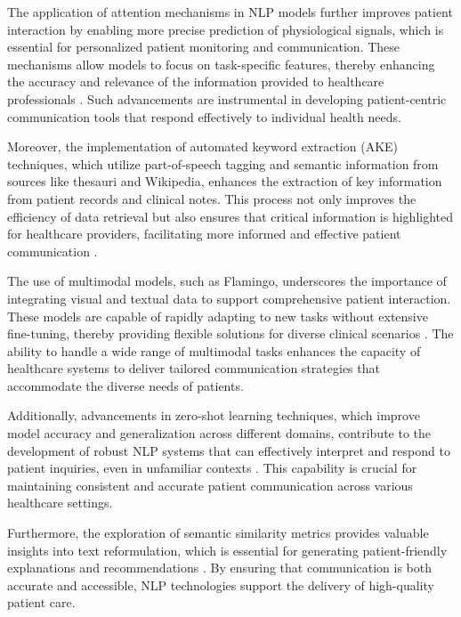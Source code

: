The application of attention mechanisms in NLP models further improves patient interaction by enabling more precise prediction of physiological signals, which is essential for personalized patient monitoring and communication. These mechanisms allow models to focus on task-specific features, thereby enhancing the accuracy and relevance of the information provided to healthcare professionals \cite{park2022attentionmechanismsphysiologicalsignal}. Such advancements are instrumental in developing patient-centric communication tools that respond effectively to individual health needs.



Moreover, the implementation of automated keyword extraction (AKE) techniques, which utilize part-of-speech tagging and semantic information from sources like thesauri and Wikipedia, enhances the extraction of key information from patient records and clinical notes. This process not only improves the efficiency of data retrieval but also ensures that critical information is highlighted for healthcare providers, facilitating more informed and effective patient communication \cite{altuncu2022improvingperformanceautomatickeyword}.



The use of multimodal models, such as Flamingo, underscores the importance of integrating visual and textual data to support comprehensive patient interaction. These models are capable of rapidly adapting to new tasks without extensive fine-tuning, thereby providing flexible solutions for diverse clinical scenarios \cite{alayrac2022flamingo}. The ability to handle a wide range of multimodal tasks enhances the capacity of healthcare systems to deliver tailored communication strategies that accommodate the diverse needs of patients.



Additionally, advancements in zero-shot learning techniques, which improve model accuracy and generalization across different domains, contribute to the development of robust NLP systems that can effectively interpret and respond to patient inquiries, even in unfamiliar contexts \cite{gao2023benefitslabeldescriptiontrainingzeroshot}. This capability is crucial for maintaining consistent and accurate patient communication across various healthcare settings.



Furthermore, the exploration of semantic similarity metrics provides valuable insights into text reformulation, which is essential for generating patient-friendly explanations and recommendations \cite{yamshchikov2020styletransferparaphraselookingsensible}. By ensuring that communication is both accurate and accessible, NLP technologies support the delivery of high-quality patient care.



